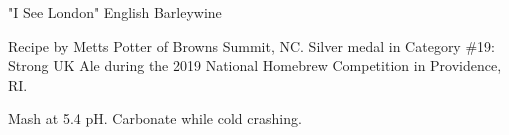 \stylesection{\styleenglishbarleywine}

\begin{recipe}{"I See London" English Barleywine}

\begin{aboutblock}
Recipe by Metts Potter of Browns Summit, NC. Silver medal in Category \#19:
Strong UK Ale during the 2019 National Homebrew Competition in Providence,
RI. \sourceaha
\end{aboutblock}


\begin{methodandtiming}
 
\begin{mashsteps}
\end{mashsteps}

\begin{fermentationsteps}
\end{fermentationsteps}

\begin{directions}
Mash at 5.4 pH. Carbonate while cold crashing.
\end{directions}

\end{methodandtiming}

\recipebreak

\begin{ingredientsblock}

\begin{malts}
\end{malts}

\begin{hops}
\end{hops}


\end{ingredientsblock}

\end{recipe}

